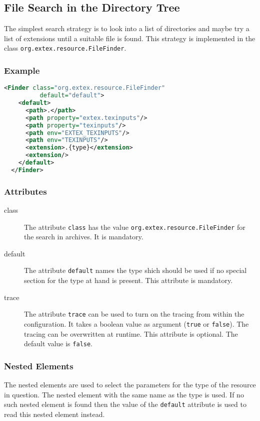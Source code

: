 \subsection{File Search in the Directory Tree}

The simplest search strategy is to look into a list of directories and
maybe try a list of extensions until a suitable file is found. This
strategy is implemented in the class
\texttt{org.extex.resource.FileFinder}.

\subsubsection*{Example}

\begin{lstlisting}[language=XML]
  <Finder class="org.extex.resource.FileFinder"
          default="default">
    <default>
      <path>.</path>
      <path property="extex.texinputs"/>
      <path property="texinputs"/>
      <path env="EXTEX_TEXINPUTS"/>
      <path env="TEXINPUTS"/>
      <extension>.{type}</extension>
      <extension/>
    </default>
  </Finder>
\end{lstlisting}

\subsubsection*{Attributes}
\begin{description}
\item[class] The attribute \texttt{class} has the value
  \texttt{org.extex.resource.FileFinder} for the search in
  archives. It is mandatory.
\item[default] The attribute \texttt{default} names the type shich
  should be used if no special section for the type at hand is
  present. This attribute is mandatory.
\item[trace] The attribute \texttt{trace} can be used to turn on the
  tracing from within the configuration. It takes a boolean value as
  argument (\texttt{true} or \texttt{false}). The tracing can be
  overwritten at runtime. This attribute is optional. The default
  value is \texttt{false}.
\end{description}

\subsubsection*{Nested Elements}

The nested elements are used to select the parameters for the type of
the resource in question. The nested element with the same name as the
type is used. If no such nested element is found then the value of the
\texttt{default} attribute is used to read this nested element
instead. 

